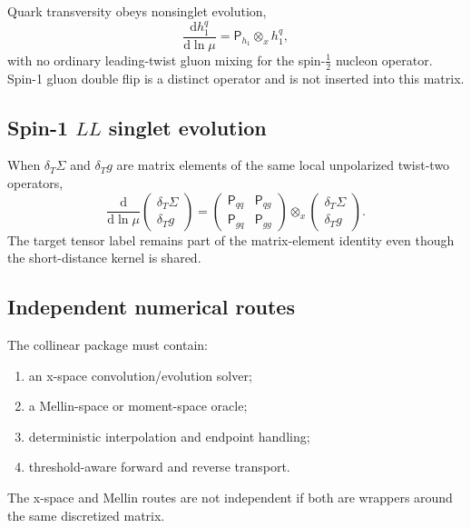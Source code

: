 \documentclass[11pt]{article}
\newcommand{\dd}{\mathrm{d}}
\newcommand{\otimesx}{\mathbin{\otimes_x}}
\begin{document}
Quark transversity obeys nonsinglet evolution,
\begin{equation}
 \frac{\dd h_1^q}{\dd\ln\mu}
 =
 \mathsf P_{h_1}\otimesx h_1^q,
 \label{eq:transversity-evolution}
\end{equation}
with no ordinary leading-twist gluon mixing for the spin-\(\tfrac12\) nucleon operator.  Spin-1 gluon double flip is a distinct operator and is not inserted into this matrix.

\subsection{Spin-1 \texorpdfstring{\(LL\)}{LL} singlet evolution}

When \(\delta_T\Sigma\) and \(\delta_Tg\) are matrix elements of the same local unpolarized twist-two operators,
\begin{equation}
 \frac{\dd}{\dd\ln\mu}
 \begin{pmatrix}\delta_T\Sigma\\\delta_Tg\end{pmatrix}
 =
 \begin{pmatrix}
 \mathsf P_{qq}&\mathsf P_{qg}\\
 \mathsf P_{gq}&\mathsf P_{gg}
 \end{pmatrix}
 \otimesx
 \begin{pmatrix}\delta_T\Sigma\\\delta_Tg\end{pmatrix}.
 \label{eq:ll-evolution}
\end{equation}
The target tensor label remains part of the matrix-element identity even though the short-distance kernel is shared.

\subsection{Independent numerical routes}

The collinear package must contain:
\begin{enumerate}
\item an x-space convolution/evolution solver;
\item a Mellin-space or moment-space oracle;
\item deterministic interpolation and endpoint handling;
\item threshold-aware forward and reverse transport.
\end{enumerate}
The x-space and Mellin routes are not independent if both are wrappers around the same discretized matrix.
\end{document}
